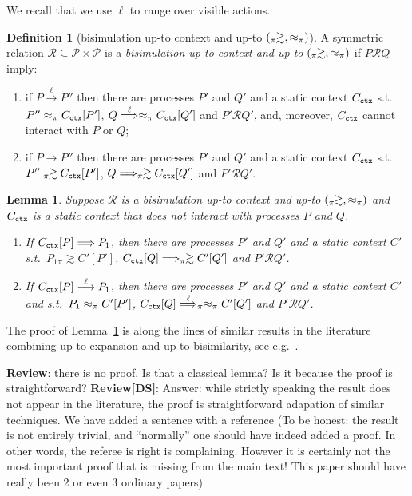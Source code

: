 \documentclass[11pt,a4paper]{amsart}
\theoremstyle{plain}
\theoremstyle{definition}
\theoremstyle{defC}
\theoremstyle{thmC}
\theoremstyle{plain}
\numberwithin{equation}{section}
\newcommand{\pr}{{\mathcal P}}
\newcommand{\ct}[1]{ C_{\rmm{ctx}} \brac{#1} }   %
\newcommand{\qct}{ C_{\rmm{ctx}}  }              %
\newcommand{\ctp}[1]{ C' \brac{#1} }   %
\newcommand{\qctp}{ C'  }              %
\newcommand{\brac}[1]{[#1] }   %
\newcommand{\rmm}[1]{{\tt{\lowercase{#1}}}}
\newcommand{\genArr}[2]{\mathrel{\stackrel{{#1}}{\Longrightarrow}_{\rmm{\lowercase{#2}}}}}  %
\newcommand{\ArrPI}[1]{\genArr{#1}{\pi}}   %
\newcommand{\arr}[1]{\mathrel{\stackrel{{#1}}{\longrightarrow}}}  %
\newcommand{\Arr}[1]{\mathrel{\stackrel{{#1}}{\Longrightarrow}}}  %
\newcommand{\genwb}[1]{\mathrel{\approx_{\rmm{\lowercase{#1}}}}}       %
\newcommand{\wbPI}{\genwb{\pi}}       %
\newcommand{\contr}{\mathrel{\mbox{}_{\pi}\!\!\gtrsim}}
\def\R{{\mathcal R}}
\def\RR{\mathrel{\mathcal R}}
\theoremstyle{plain}
\newtheorem{lemma}[thm]{Lemma}
\theoremstyle{definition}
\newtheorem{definition}[thm]{Definition}
\newcommand{\reviewComment}[1]{\textbf{Review}: {\color{red} #1}}
\newcommand{\reviewCommentDS}[1]{\textbf{Review[DS]}: {\color{green} #1}}
\newcommand{\reviewComment}[1]{}
\newcommand{\reviewCommentDS}[1]{}
\begin{document}
We recall that we use $\ell$ to range over visible actions. 
\begin{definition}[bisimulation up-to context and up-to $(\contr,
 \wbPI)$]
\label{d:uptocontext_contr_wb}
A symmetric relation $  \R   \subseteq \pr \times \pr $ is a 
{\em bisimulation up-to context and up-to $(\contr,\wbPI)$}
if $P \RR Q$ imply:
  \begin{enumerate}
  \item if $P \arr\ell P''$
  then there are processes $P'$ and $Q'$ 
  and a static context $\qct$  
  s.t.\  $P'' \wbPI \ct {P'}$, $Q \Arr\ell  \wbPI  \ct{Q'}$ 
  and $P' \RR Q'$, 
  and, moreover, $\qct$ cannot interact with $P$ or $Q$; 
  \item if $P \longrightarrow P''$
  then there are processes $P'$ and $Q'$
  and a static context $\qct$
  s.t.\  $ P'' \contr \ct {P'}$, 
  $Q \Longrightarrow \contr  \ct{Q'}$ 
  and $P' \RR Q'$.
  \end{enumerate}
\end{definition}


\begin{lemma}
  \label{l:upto_new}
  Suppose $ \R  $  is a 
  bisimulation up-to context and up-to $(\contr,\wbPI)$ 
  and $\qct$ is a static context 
  that does not interact with processes $P$ and $Q$.  
  \begin{enumerate}
  \item  
  If  $\ct{P}\Longrightarrow   P_1$, 
  then there are processes $P'$ and $Q'$ 
  and a static context $\qctp$
  s.t.\  
  $P_1 \contr \ctp{P'}$, 
  $\ct Q \Longrightarrow \contr \ctp{Q'}$ 
  and $P'  \R  Q'$. 
  
  \item 
  If $\ct{P}\arr\ell   P_1$, 
  then there are processes $P'$ and $Q'$ and 
  a static context $\qctp$ and 
  s.t.\  
  $P_1 \wbPI \ctp{P'}$, 
  $\ct Q \ArrPI\ell \wbPI \ctp{Q'}$ 
  and $P'  \R  Q'$. 
  \end{enumerate} 
\end{lemma}

\noindent
The proof of  Lemma~\ref{l:upto_new} is along the lines of similar results in the
literature combining up-to expansion and up-to bisimilarity, see e.g.~\cite{SaWabook}. 

\reviewComment{there is no proof. Is that a classical lemma? Is it
because the proof is straightforward?}
\reviewCommentDS{Answer: while strictly speaking the result does not appear in the
  literature, the proof is straightforward adapation of  similar techniques. We have added
a sentence with a reference  (To be honest: the result is not entirely trivial, and
``normally'' one should have indeed added a proof. In other words, the referee  is right
is complaining. However it is certainly not the most important proof that is missing from
the main text! This paper should have really been 2 or even 3 ordinary papers)}
\end{document}
